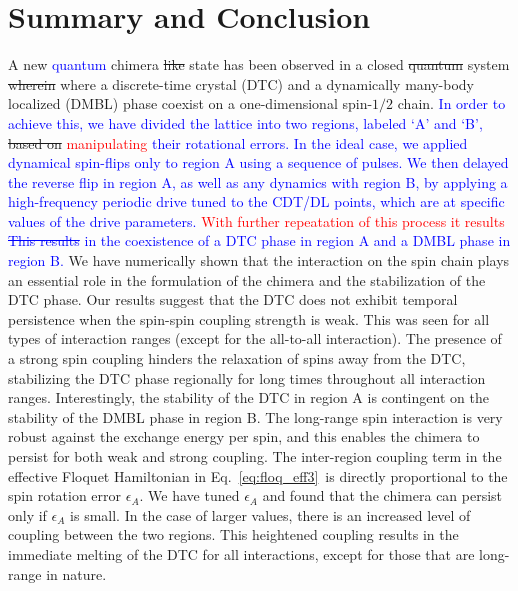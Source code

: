 \documentclass[12pt]{iopart}
\newcommand{\red}[1]{\textcolor{red}{#1}}
\newcommand{\blue}[1]{\textcolor{blue}{#1}}
\begin{document}
\section{\label{sec:level7} Summary and Conclusion}
A new \blue{quantum} chimera \sout{like} state has been observed in a closed \sout{quantum} system \sout{wherein} where a discrete-time crystal (DTC) and a dynamically many-body localized (DMBL) phase coexist on a one-dimensional spin-$1/2$ chain. \blue{In order to achieve this, we have divided the lattice into two regions, labeled `A' and `B',} \sout{based on} \red{manipulating} \blue{their rotational errors. In the ideal case, we applied dynamical spin-flips only to region A using a sequence of pulses. We then delayed the reverse flip in region A, as well as any dynamics with region B, by applying a high-frequency periodic drive tuned to the CDT/DL points, which are at specific values of the drive parameters.} \red{With further repeatation of this process it results} \blue{\sout{This results}} \blue{in the coexistence of a DTC phase in region A and a DMBL phase in region B.} We have numerically shown that the interaction on the spin chain plays an essential role in the formulation of the chimera and the stabilization of the DTC phase. Our results suggest that the DTC does not exhibit temporal persistence when the spin-spin coupling strength is weak. This was seen for all types of interaction ranges (except for the all-to-all interaction). The presence of a strong spin coupling hinders the relaxation of spins away from the DTC, stabilizing the DTC phase regionally for long times throughout all interaction ranges. Interestingly, the stability of the DTC in region A is contingent on the stability of the DMBL phase in region B. The long-range spin interaction is very robust against the exchange energy per spin, and this enables the chimera to persist for both weak and strong coupling. %
The inter-region coupling term in the effective Floquet Hamiltonian in Eq.~\ref{eq:floq_eff3} is directly proportional to the spin rotation error $\epsilon_A$. We have tuned $\epsilon_A$ and found that the chimera can persist only if $\epsilon_A$ is small. In the case of larger values, there is an increased level of coupling between the two regions. This heightened coupling results in the immediate melting of the DTC for all interactions, except for those that are long-range in nature.
	
\end{document}
